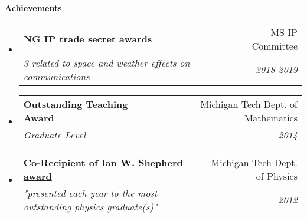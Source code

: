 \documentclass[letterpaper,11pt]{article}
\makeatletter
\newcommand{\resheading}[1]{{\large \textbf{#1}}}
\newcommand{\ressubheading}[4]{
\begin{tabular*}{6.5in}{l@{\extracolsep{\fill}}r}
		\textbf{#1} & #2 \\
		\textit{#3} & \textit{#4} \\
\end{tabular*}\vspace{-6pt}}
\makeatother
\begin{document}
\resheading{Achievements}
\begin{itemize}
\item
\ressubheading{NG IP trade secret awards}{MS IP Committee}{3 related to space and weather effects on communications}{2018-2019}
\item
\ressubheading{Outstanding Teaching Award}{Michigan Tech Dept. of Mathematics}{Graduate Level}{2014}
\item
\ressubheading{Co-Recipient of \href{http://www.mtu.edu/physics/department/profile/awards/shepherd.html}{Ian W. Shepherd award}}{Michigan Tech Dept. of Physics}{"presented each year to the most outstanding physics graduate(s)"}{2012}
\begin{comment}
\item
\ressubheading{Departmental Scholar}{Michigan Tech Dept. of Physics}{}{2011}
\item
\ressubheading{Certificate of Merit}{Dept. of Mathematical Sciences}{For my performance in the Applied Vector/Tensor Analysis course}{Dec. 2011}
\end{comment}
\end{itemize}
\end{document}
